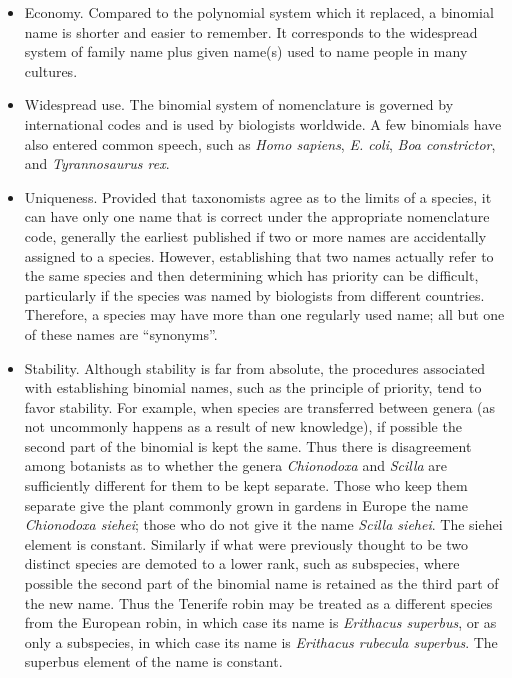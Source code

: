 \begin{itemize}
\tightlist
\item
  Economy. Compared to the polynomial system which it replaced, a binomial name is shorter and easier to remember. It corresponds to the widespread system of family name plus given name(s) used to name people in many cultures.
\item
  Widespread use. The binomial system of nomenclature is governed by international codes and is used by biologists worldwide. A few binomials have also entered common speech, such as \emph{Homo sapiens}, \emph{E. coli}, \emph{Boa constrictor}, and \emph{Tyrannosaurus rex}.
\item
  Uniqueness. Provided that taxonomists agree as to the limits of a species, it can have only one name that is correct under the appropriate nomenclature code, generally the earliest published if two or more names are accidentally assigned to a species. However, establishing that two names actually refer to the same species and then determining which has priority can be difficult, particularly if the species was named by biologists from different countries. Therefore, a species may have more than one regularly used name; all but one of these names are ``synonyms''.
\item
  Stability. Although stability is far from absolute, the procedures associated with establishing binomial names, such as the principle of priority, tend to favor stability. For example, when species are transferred between genera (as not uncommonly happens as a result of new knowledge), if possible the second part of the binomial is kept the same. Thus there is disagreement among botanists as to whether the genera \emph{Chionodoxa} and \emph{Scilla} are sufficiently different for them to be kept separate. Those who keep them separate give the plant commonly grown in gardens in Europe the name \emph{Chionodoxa siehei}; those who do not give it the name \emph{Scilla siehei}. The siehei element is constant. Similarly if what were previously thought to be two distinct species are demoted to a lower rank, such as subspecies, where possible the second part of the binomial name is retained as the third part of the new name. Thus the Tenerife robin may be treated as a different species from the European robin, in which case its name is \emph{Erithacus superbus}, or as only a subspecies, in which case its name is \emph{Erithacus rubecula superbus}. The superbus element of the name is constant.
\end{itemize}

